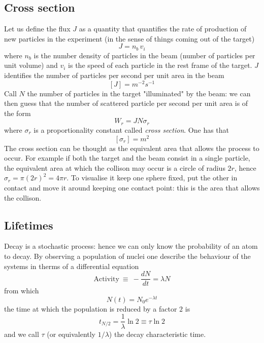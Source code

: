 \subsection*{Cross section}
Let us define the flux $J$ as a quantity that quantifies the rate of production of new particles
in the experiment (in the sense of things coming out of the target)
\begin{equation*}
    J = n_b \, v_i
\end{equation*}
where $n_b$ is the number density of particles in the beam (number of particles per unit volume) and 
$v_i$ is the speed of each particle in the rest frame of the target.
$J$ identifies the number of particles per second per unit area in the beam
\begin{equation*}
    \left[J\right] = m^{-2}s^{-1}
\end{equation*}
Call $N$ the number of particles in the target "illuminated" by the beam: we can then guess that
the number of scattered particle per second per unit area is of the form
\begin{equation*}
    W_r = J N \sigma_r
\end{equation*}
where $\sigma_r$ is a proportionality constant called \emph{cross section}. One has that 
\begin{equation*}
    \left[\sigma_r\right] = m^2
\end{equation*}
The cross section can be thought as the equivalent area that allows the process to occur. 
For example if both the target and the beam consist in a single particle, the equivalent area
at which the collison may occur is a circle of radius $2r$, hence $\sigma_r = \pi\left(2r\right)^2 
= 4\pi r$. To visualise it keep one sphere fixed, put the other
in contact and move it around keeping one contact point: this is the area that allows the collison.

\subsection*{Lifetimes}
Decay is a stochastic process: hence we can only know the probability of an atom to decay.
By observing a population of nuclei one describe the behaviour of the systems in therms of a
differential equation
\begin{equation*}
    \text{Activity} \ \equiv \ -\frac{dN}{dt} = \lambda N
\end{equation*}
from which
\begin{equation*}
    N(t) = N_0 e^{-\lambda t}
\end{equation*}
the time at which the population is reduced by a factor $2$ is 
$$t_{N/2} = \frac{1}{\lambda} \ln 2 \equiv \tau \ln 2$$
and we call $\tau$ (or equivalently $1/\lambda$) the decay characteristic time.

